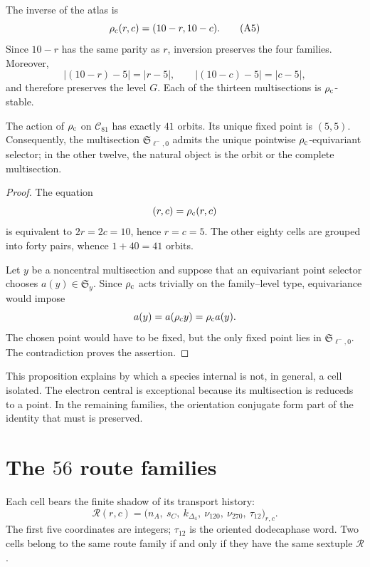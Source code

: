 The inverse of the atlas is
\[
 \rho_{\rm c}(r,c)=(10-r,10-c).
 \tag{A5}\label{eq:inversion-central-atlas-rev6}
\]
Since \(10-r\) has the same parity as \(r\), inversion preserves the
four families.  Moreover,
\[
 |(10-r)-5|=|r-5|,
 \qquad
 |(10-c)-5|=|c-5|,
\]
and therefore preserves the level \(G\).  Each of the thirteen
multisections is \(\rho_{\rm c}\)-stable.

\begin{proposition}
\label{prop:orbitas-centro-atlas-rev6}
The action of \(\rho_{\rm c}\) on \(\mathcal C_{81}\) has exactly
\(41\) orbits.  Its unique fixed point is \((5,5)\).  Consequently, the
multisection \(\mathfrak S_{\ell^-,0}\) admits the unique pointwise
\(\rho_{\rm c}\)-equivariant selector; in the other twelve, the natural object is the
orbit or the complete multisection.
\end{proposition}

\begin{proof}
The equation
\[
 (r,c)=\rho_{\rm c}(r,c)
\]
is equivalent to \(2r=2c=10\), hence \(r=c=5\).  The other eighty cells are
grouped into forty pairs, whence \(1+40=41\) orbits.

Let \(y\) be a noncentral multisection and suppose that an equivariant point selector
chooses \(a(y)\in\mathfrak S_y\).  Since \(\rho_{\rm c}\) acts
trivially on the family--level type, equivariance would impose
\[
 a(y)=a(\rho_{\rm c}y)=\rho_{\rm c}a(y).
\]
The chosen point would have to be fixed, but the only fixed point lies in
\(\mathfrak S_{\ell^-,0}\).  The contradiction proves the assertion.
\end{proof}

This proposition explains by which a species internal is not, in general, a
cell isolated.  The electron central is exceptional because its multisection
is reduceds to a point.  In the remaining families, the orientation conjugate form
part of the identity that must is preserved.

\section{The \(56\) route families}

Each cell bears the finite shadow of its transport history:
\[
 \mathcal R(r,c)=
 \bigl(
 n_A,\ s_C,\ k_{\Delta_4},\
 \nu_{120},\ \nu_{270},\ \tau_{12}
 \bigr)_{r,c}.
 \tag{A6}\label{eq:lector-familia-ruta-atlas}
\]
The first five coordinates are integers; \(\tau_{12}\) is the oriented
dodecaphase word. Two cells belong to the same route family
if and only if they have the same sextuple \(\mathcal R\).


